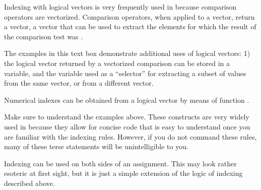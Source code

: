 \documentclass[krantz2]{krantz}\usepackage{knitr}
\begin{document}
Indexing with logical vectors is very frequently used in \Rlang because comparison operators are vectorized. Comparison operators, when applied to a vector, return a  vector, a vector that can be used to extract the elements for which the result of the comparison test was .

\begin{playground}
The examples in this text box demonstrate additional uses of logical vectors: 1) the logical vector returned by a vectorized comparison can be stored in a variable, and the variable used as a ``selector'' for extracting a subset of values from the same vector, or from a different vector.

\begin{knitrout}\footnotesize
{}\color{fgcolor}\begin{kframe}
\begin{alltt}
 \hlkwb{<-} \hlstd{letters[}\hlopt{:}\hlstd{]}
 \hlkwb{<-} \hlopt{:}
 \hlkwb{<-}  \hlopt{>} 
\end{alltt}
\end{kframe}
\end{knitrout}

Numerical indexes can be obtained from a logical vector by means of function .

\begin{knitrout}\footnotesize
{}\color{fgcolor}\begin{kframe}
\begin{alltt}
 \hlkwb{<-}  \hlopt{>} \hlstd{)}
\end{alltt}
\end{kframe}
\end{knitrout}

Make sure to understand the examples above. These constructs are very widely used in \Rlang because they allow for concise code that is easy to understand once you are familiar with the indexing rules. However, if you do not command these rules, many of these terse statements will be unintelligible to you.
\end{playground}

Indexing can be used on both sides of an assignment. This may look rather esoteric at first sight, but it is just a simple extension of the logic of indexing described above.
\end{document}
